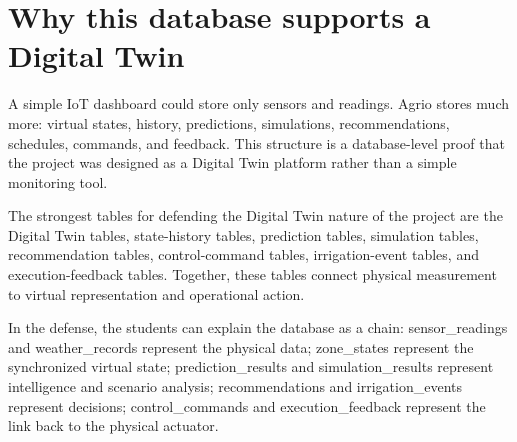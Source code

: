\section{Why this database supports a Digital Twin}

A simple IoT dashboard could store only sensors and readings. Agrio stores much more: virtual states, history, predictions, simulations, recommendations, schedules, commands, and feedback. This structure is a database-level proof that the project was designed as a Digital Twin platform rather than a simple monitoring tool.

The strongest tables for defending the Digital Twin nature of the project are the Digital Twin tables, state-history tables, prediction tables, simulation tables, recommendation tables, control-command tables, irrigation-event tables, and execution-feedback tables. Together, these tables connect physical measurement to virtual representation and operational action.

In the defense, the students can explain the database as a chain: sensor\_readings and weather\_records represent the physical data; zone\_states represent the synchronized virtual state; prediction\_results and simulation\_results represent intelligence and scenario analysis; recommendations and irrigation\_events represent decisions; control\_commands and execution\_feedback represent the link back to the physical actuator.
